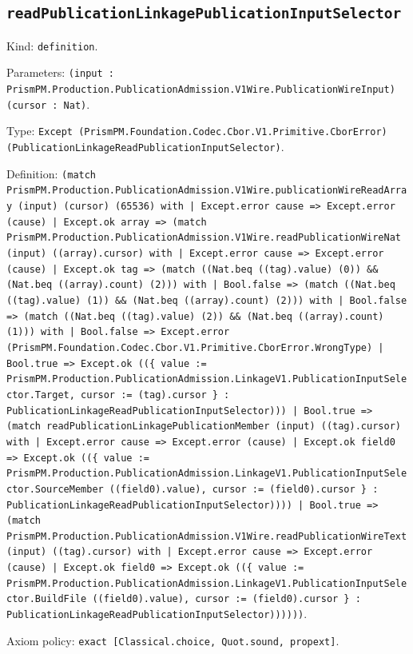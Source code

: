 \documentclass[11pt]{article}
\begin{document}
\subsection*{\texttt{readPublicationLinkagePublicationInputSelector}}
\noindent Kind: \texttt{definition}.\par
\noindent Parameters: \texttt{(input : PrismPM.Production.PublicationAdmission.V1Wire.PublicationWireInput) (cursor : Nat)}.\par
\noindent Type: \texttt{Except (PrismPM.Foundation.Codec.Cbor.V1.Primitive.CborError) (PublicationLinkageReadPublicationInputSelector)}.\par
\noindent Definition: \texttt{(match PrismPM.Production.PublicationAdmission.V1Wire.publicationWireReadArray (input) (cursor) (65536) with | Except.error cause => Except.error (cause) | Except.ok array => (match PrismPM.Production.PublicationAdmission.V1Wire.readPublicationWireNat (input) ((array).cursor) with | Except.error cause => Except.error (cause) | Except.ok tag => (match ((Nat.beq ((tag).value) (0)) \&\& (Nat.beq ((array).count) (2))) with | Bool.false => (match ((Nat.beq ((tag).value) (1)) \&\& (Nat.beq ((array).count) (2))) with | Bool.false => (match ((Nat.beq ((tag).value) (2)) \&\& (Nat.beq ((array).count) (1))) with | Bool.false => Except.error (PrismPM.Foundation.Codec.Cbor.V1.Primitive.CborError.WrongType) | Bool.true => Except.ok ((\{ value := PrismPM.Production.PublicationAdmission.LinkageV1.PublicationInputSelector.Target, cursor := (tag).cursor \} : PublicationLinkageReadPublicationInputSelector))) | Bool.true => (match readPublicationLinkagePublicationMember (input) ((tag).cursor) with | Except.error cause => Except.error (cause) | Except.ok field0 => Except.ok ((\{ value := PrismPM.Production.PublicationAdmission.LinkageV1.PublicationInputSelector.SourceMember ((field0).value), cursor := (field0).cursor \} : PublicationLinkageReadPublicationInputSelector)))) | Bool.true => (match PrismPM.Production.PublicationAdmission.V1Wire.readPublicationWireText (input) ((tag).cursor) with | Except.error cause => Except.error (cause) | Except.ok field0 => Except.ok ((\{ value := PrismPM.Production.PublicationAdmission.LinkageV1.PublicationInputSelector.BuildFile ((field0).value), cursor := (field0).cursor \} : PublicationLinkageReadPublicationInputSelector))))))}.\par
\noindent Axiom policy: \texttt{exact [Classical.choice, Quot.sound, propext]}.\par
\end{document}
